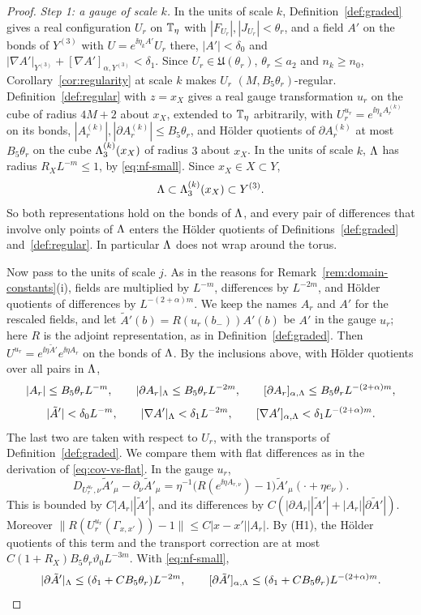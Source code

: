 \begin{proof}
\emph{Step 1: a gauge of scale $k$.} In the units of scale $k$, Definition~\ref{def:graded} gives a real configuration $U_r$ on $\mathbb T_\eta$ with $|F_{U_r}|,|J_{U_r}|<\theta_r$, and a field $A'$ on the bonds of $Y^{(3)}$ with $U=e^{\ii\eta_kA'}U_r$ there, $|A'|<\delta_0$ and $|\nabla A'|_{Y^{(3)}}+[\nabla A']_{\alpha,Y^{(3)}}<\delta_1$. Since $U_r\in\mathfrak U(\theta_r)$, $\theta_r\le a_2$ and $n_k\ge n_0$, Corollary~\ref{cor:regularity} at scale $k$ makes $U_r$ $(M,B_5\theta_r)$-regular. Definition~\ref{def:regular} with $z=x_X$ gives a real gauge transformation $u_r$ on the cube of radius $4M+2$ about $x_X$, extended to $\mathbb T_\eta$ arbitrarily, with $U_r^{u_r}=e^{\ii\eta_kA^{(k)}_r}$ on its bonds, $|A^{(k)}_r|,|\partial A^{(k)}_r|\le B_5\theta_r$, and H\"older quotients of $\partial A^{(k)}_r$ at most $B_5\theta_r$ on the cube $\Lambda^{(k)}_3(x_X)$ of radius $3$ about $x_X$. In the units of scale $k$, $\Lambda$ has radius $R_XL^{-m}\le1$, by \eqref{eq:nf-small}. Since $x_X\in X\subset Y$,
\[
\Lambda\subset\Lambda^{(k)}_3(x_X)\subset Y^{(3)} .
\]
So both representations hold on the bonds of $\Lambda$, and every pair of differences that involve only points of $\Lambda$ enters the H\"older quotients of Definitions~\ref{def:graded} and~\ref{def:regular}. In particular $\Lambda$ does not wrap around the torus.

Now pass to the units of scale $j$. As in the reasons for Remark~\ref{rem:domain-constants}(i), fields are multiplied by $L^{-m}$, differences by $L^{-2m}$, and H\"older quotients of differences by $L^{-(2+\alpha)m}$. We keep the names $A_r$ and $A'$ for the rescaled fields, and let $\tilde A'(b)=R(u_r(b_-))A'(b)$ be $A'$ in the gauge $u_r$; here $R$ is the adjoint representation, as in Definition~\ref{def:graded}. Then $U^{u_r}=e^{\ii\eta\tilde A'}e^{\ii\eta A_r}$ on the bonds of $\Lambda$. By the inclusions above, with H\"older quotients over all pairs in $\Lambda$,
\[
|A_r|\le B_5\theta_rL^{-m},\qquad|\partial A_r|_\Lambda\le B_5\theta_rL^{-2m},\qquad[\partial A_r]_{\alpha,\Lambda}\le B_5\theta_rL^{-(2+\alpha)m},
\]
\[
|\tilde A'|<\delta_0L^{-m},\qquad|\nabla A'|_\Lambda<\delta_1L^{-2m},\qquad[\nabla A']_{\alpha,\Lambda}<\delta_1L^{-(2+\alpha)m}.
\]
The last two are taken with respect to $U_r$, with the transports of Definition~\ref{def:graded}. We compare them with flat differences as in the derivation of \eqref{eq:cov-vs-flat}. In the gauge $u_r$,
\[
D_{U_r^{u_r},\nu}\tilde A'_\mu-\partial_\nu\tilde A'_\mu=\eta^{-1}\big(R(e^{\ii\eta A_{r,\nu}})-1\big)\tilde A'_\mu(\cdot+\eta e_\nu).
\]
This is bounded by $C|A_r||\tilde A'|$, and its differences by $C(|\partial A_r||\tilde A'|+|A_r||\partial\tilde A'|)$. Moreover $\|R(U_r^{u_r}(\Gamma_{x,x'}))-1\|\le C|x-x'||A_r|$. By (H1), the H\"older quotients of this term and the transport correction are at most $C(1+R_X)B_5\theta_r\vartheta_0L^{-3m}$. With \eqref{eq:nf-small},
\[
|\partial\tilde A'|_\Lambda\le(\delta_1+CB_5\theta_r)L^{-2m},\qquad[\partial\tilde A']_{\alpha,\Lambda}\le(\delta_1+CB_5\theta_r)L^{-(2+\alpha)m}.
\]


\end{proof}

